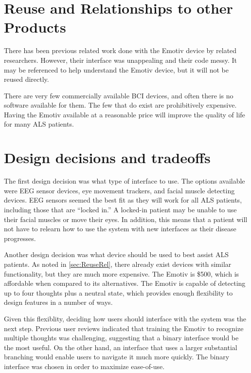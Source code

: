 \documentclass{article}
\begin{document}
\newpage

\section{Reuse and Relationships to other Products}
\label{sec:ReuseRel}

There has been previous related work done with the Emotiv device by related
researchers. However, their interface was unappealing and their code messy. It
may be referenced to help understand the Emotiv device, but it will not be
reused directly.

There are very few commercially available BCI devices, and often there is no
software available for them. The few that do exist are prohibitively
expensive. Having the Emotiv available at a reasonable price will improve the
quality of life for many ALS patients.

\section{Design decisions and tradeoffs}

The first design decision was what type of interface to use.  The options
available were EEG sensor devices, eye movement trackers, and facial muscle
detecting devices. EEG sensors seemed the best fit as they will work for all
ALS patients, including those that are ``locked in.'' A locked-in patient
may be unable to use their facial muscles or move their eyes. In addition,
this means that a patient will not have to relearn how to use the system
with new interfaces as their disease progresses.

Another design decision was what device should be used to best assist ALS
patients. As noted in \autoref{sec:ReuseRel}, there already exist devices with
similar functionality, but they are much more expensive. The Emotiv is \$500,
which is affordable when compared to its alternatives. The Emotiv is capable
of detecting up to four thoughts plus a neutral state, which provides enough
flexibility to design features in a number of ways.

Given this flexiblity, deciding how users should interface with the system was
the next step. Previous user reviews indicated that training the Emotiv to
recognize multiple thoughts was challenging, suggesting that a binary
interface would be the most useful. On the other hand, an interface that uses
a larger substantial branching would enable users to navigate it much more
quickly. The binary interface was chosen in order to maximize ease-of-use.
\end{document}
